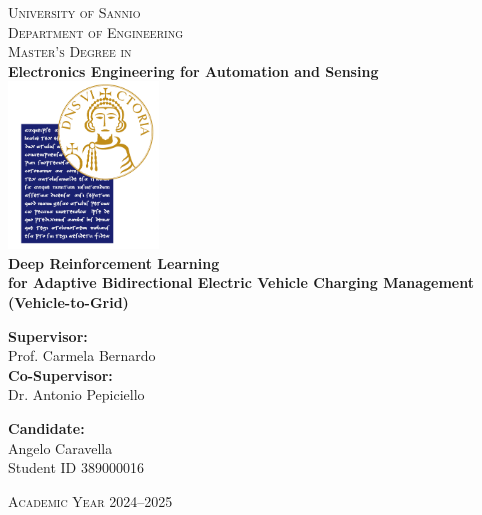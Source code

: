\documentclass[a4paper,12pt]{report}
\begin{document}
  

\begin{titlepage}
    \begin{center}
    \large
        \textsc{\LARGE University of Sannio}\\[1cm]
        \textsc{Department of Engineering}\\[0.8cm]
        \textsc{Master’s Degree in}\\[0.6cm]
        \textbf{Electronics Engineering for Automation and Sensing}\\[1cm]
        
        \includegraphics[width=0.3\textwidth]{Logo.png}\\[1cm]
        
        {\Huge \bfseries Deep Reinforcement Learning\\[0.01cm]
        for Adaptive Bidirectional Electric Vehicle Charging Management\\[0.3cm]
        (Vehicle-to-Grid)}\\[2cm]
        
        \begin{minipage}{0.45\textwidth}
    \raggedright
    \textbf{Supervisor:}\\
    Prof. Carmela Bernardo \\[0.8cm]
    \textbf{Co-Supervisor:}\\
    Dr. Antonio Pepiciello 
\end{minipage}
\hfill
\begin{minipage}{0.45\textwidth}
    \raggedleft
    \textbf{Candidate:}\\
    Angelo Caravella
    \\
     Student ID 389000016
\end{minipage}

\vspace{0.5cm}
        \textsc{Academic Year 2024--2025}
    \end{center}
\end{titlepage}
\end{document}
